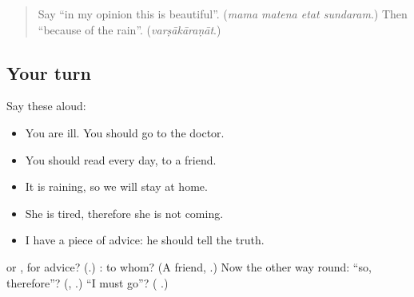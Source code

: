 \label{lesson:SA-R279-advice-and-what-follows}



\begin{quote}
Say \textquotedblleft{}in my opinion this is beautiful\textquotedblright{}. (\emph{mama matena etat sundaram}.) Then \textquotedblleft{}because of the rain\textquotedblright{}. (\emph{varṣākāraṇāt}.)
\end{quote}

\subsection*{Your turn}
Say these aloud:

\begin{itemize}
\raggedright
  \item You are ill. You should go to the doctor.
  \item You should read every day, to a friend.
  \item It is raining, so we will stay at home.
  \item She is tired, therefore she is not coming.
  \item I have a piece of advice: he should tell the truth.
\end{itemize}

\begin{tcolorbox}[breakable,colback=teal!4,colframe=teal!35!black,title={Before you move on}]
\textbf{} or \textbf{}, for advice? (\textbf{}.) \textbf{}: to whom? (A friend, \textbf{}.) Now the other way round: \textquotedblleft{}so, therefore\textquotedblright{}? (\textbf{}, \textbf{}.) \textquotedblleft{}I must go\textquotedblright{}? (\textbf{ }.)
\end{tcolorbox}
